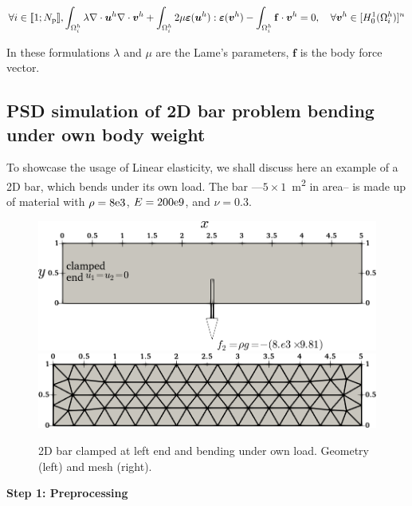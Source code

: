 \begin{equation}\label{Eq:LinearElasticity}
\forall i \in \llbracket 1; N_{\text p} \rrbracket, 
\int_{\Omega^h_i}\lambda\nabla\cdot\boldsymbol u^h\nabla\cdot\boldsymbol v^h + \int_{\Omega^h_i}2\mu\boldsymbol\varepsilon(\boldsymbol u^h):\boldsymbol\varepsilon(\boldsymbol v^h)-\int_{\Omega^h_i}\mathbf{f}\cdot\boldsymbol v^h=0, \quad\forall\boldsymbol v^h\in[H^1_0(\Omega^h_i)]^n 
\end{equation}

In these formulations $\lambda$ and $\mu$ are the Lame's parameters, $\mathbf{f}$ is the body force vector.  

\subsection{PSD simulation of 2D bar problem bending under own body weight \label{sec:2d-bar-load}}

To showcase the usage of Linear elasticity, we shall discuss here an example of a 2D bar, which bends under its own load. The bar ---$5\times1$~\si{\square\meter} in area-- is made up of material with $\rho=8\text e3$, $E=200\text e9$, and $\nu=0.3$.

\begin{figure}[htbp]
    \centering
    \includegraphics[align=t,width=.44\textwidth]{./Images/2d-bar.png}\hspace{.1\textwidth}
    \includegraphics[align=t,width=.44\textwidth]{./Images/2d-bar-mesh.png}
    \caption{2D bar clamped at left end and bending under own load. Geometry (left) and mesh (right).}
    \label{fig:2Dbar}
\end{figure} 

\textbf{Step 1: Preprocessing}

